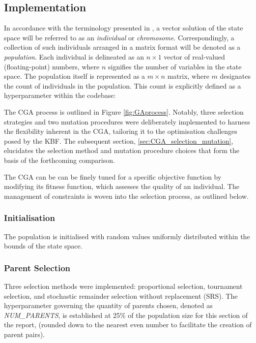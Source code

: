 \documentclass[10pt]{article}
\begin{document}
\begin{multicols}{2}
\subsection{Implementation}
\label{sec:CGA_implementation}

In accordance with the terminology presented in \cite{parks2023geneticalgorithms}, a vector solution of the state space will be referred to as an \textit{individual} or \textit{chromosome}. Correspondingly, a collection of such individuals arranged in a matrix format will be denoted as a \textit{population}. Each individual is delineated as an $n \times 1$ vector of real-valued (floating-point) numbers, where $n$ signifies the number of variables in the state space. The population itself is represented as a $m \times n$ matrix, where $m$ designates the count of individuals in the population. This count is explicitly defined as a hyperparameter within the codebase: %

The CGA process is outlined in Figure \ref{fig:GAprocess}. Notably, three selection strategies and two mutation procedures were deliberately implemented to harness the flexibility inherent in the CGA, tailoring it to the optimisation challenges posed by the KBF. The subsequent section, \ref{sec:CGA_selection_mutation}, elucidates the selection method and mutation procedure choices that form the basis of the forthcoming comparison.

The CGA can be can be finely tuned for a specific objective function by modifying its fitness function, which assesses the quality of an individual. The management of constraints is woven into the selection process, as outlined below.

\subsubsection{Initialisation}

The population is initialised with random values uniformly distributed within the bounds of the state space.

\subsubsection{Parent Selection}

Three selection methods were implemented: proportional selection, tournament selection, and stochastic remainder selection without replacement (SRS). The hyperparameter governing the quantity of parents chosen, denoted as \textit{NUM\_PARENTS}, is established at 25\% of the population size for this section of the report, (rounded down to the nearest even number to facilitate the creation of parent pairs).


\end{multicols}
\end{document}

